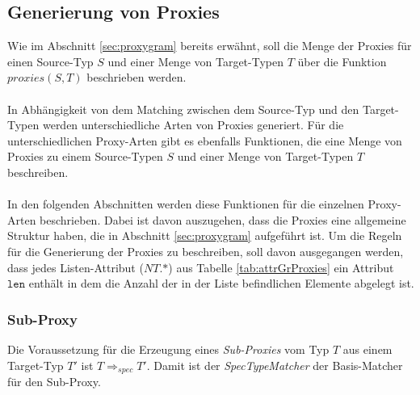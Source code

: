 \documentclass[a4paper,12pt]{article}
\begin{document}
\subsection{Generierung von Proxies}
Wie im Abschnitt \ref{sec:proxygram} bereits erwähnt, soll die Menge der Proxies für einen Source-Typ $S$ und einer Menge von Target-Typen $T$ über die Funktion $\mathit{proxies(S,T)}$ beschrieben werden.\\\\
In Abhängigkeit von dem Matching zwischen dem Source-Typ und den Target-Typen werden unterschiedliche Arten von Proxies generiert. Für die unterschiedlichen Proxy-Arten gibt es ebenfalls Funktionen, die eine Menge von Proxies zu einem Source-Typen $S$ und einer Menge von Target-Typen $T$ beschreiben.\\\\
In den folgenden Abschnitten werden diese Funktionen für die einzelnen Proxy-Arten beschrieben. Dabei ist davon auszugehen, dass die Proxies eine allgemeine Struktur haben, die in Abschnitt \ref{sec:proxygram} aufgeführt ist. Um die Regeln für die Generierung der Proxies zu beschreiben, soll davon ausgegangen werden, dass jedes Listen-Attribut ($\mathit{NT.}\text{*}$) aus Tabelle \ref{tab:attrGrProxies} ein Attribut $\texttt{len}$ enthält in dem die Anzahl der in der Liste befindlichen Elemente abgelegt ist.


\subsubsection{Sub-Proxy}
Die Voraussetzung für die Erzeugung eines \emph{Sub-Proxies} vom Typ $T$ aus einem Target-Typ $T'$ ist $T \Rightarrow_{spec} T'$. Damit ist der \emph{SpecTypeMatcher} der Basis-Matcher für den Sub-Proxy.
\end{document}
